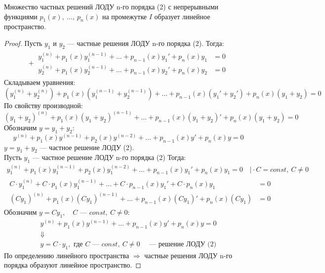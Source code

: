 \begin{theorem}
    Множество частных решений ЛОДУ n-го порядка (2) с непрерывными функциями $p_1(x),\ \ldots,\ p_n(x)$ на промежутке $I$ образует линейное пространство.
\end{theorem}
\begin{proof}
    Пусть $y_1$ и $y_2$ --- частные решения ЛОДУ n-го порядка (2). Тогда:
    \begin{align*}
        +\ \begin{aligned}
            y_1^{(n)} + p_1(x)y_1^{(n-1)} + \ldots + p_{n-1}(x)y_1' + p_n(x)y_1 &= 0 \\ 
            y_2^{(n)} + p_1(x)y_2^{(n-1)} + \ldots + p_{n-1}(x)y_2' + p_n(x)y_2 &= 0
        \end{aligned}
    \end{align*}
    Складываем уравнения:
    \[
        \left(y_1^{(n)} + y_2^{(n)}\right) + p_1(x)\left(y_1^{(n-1)} + y_2^{(n-1)}\right) + \ldots + p_{n-1} (x) \left(y_1' + y_2'\right) + p_n(x)\left(y_1 + y_2\right)= 0
    \]
    По свойству производной:
    \[
        (y_1 + y_2)^{(n)} + p_1(x) (y_1 + y_2)^{(n-1)} + \ldots + p_{n-1}(x)(y_1 + y_2)' + p_n(x)(y_1 + y_2) = 0
    \]
    Обозначим $y = y_1 + y_2$:
    \[
        y^{(n)} + p_1(x)y^{(n-1)}  + p_2(x)y^{(n-2)} + \ldots + p_{n-1}(x)y' + p_n(x)y = 0
    \]
    $y = y_1 + y_2$ --- частное решение ЛОДУ (2). \\
    Пусть $y_1$ --- частное решение ЛОДУ n-го порядка (2)
    Тогда:
    \begin{gather*}
        y_1^{(n)} + p_1(x)y_1^{(n-1)}  + p_2(x)y_1^{(n-2)} + \ldots + p_{n-1}(x)y_1' + p_n(x)y_1 = 0\quad \Big| \cdot C = const,\ C \ne 0 \\
        \begin{aligned}
            C\cdot y_1^{(n)} + C\cdot p_1(x)y_1^{(n-1)} + \ldots + C\cdot p_{n-1}(x) y_1' + C\cdot p_n(x) y_1 &= 0 \\
            (C y_1)^{(n)} + p_1(x)(Cy_1)^{(n-1)} + \ldots + p_{n-1}(x)(C y_1)' + p_n(x)(C y_1) &= 0
        \end{aligned}
    \end{gather*}
    Обозначим $y = Cy_1,\quad C \text{ --- } const,\ C \ne 0$:
    \begin{gather*}
        y^{(n)} + p_1(x)y^{(n-1)} + \ldots + p_{n-1}(x)y' + p_n(x)y = 0 \\
        \Downarrow \\
        y = C\cdot y_1, \text{ где } C \text{ --- } const,\ C \ne 0\quad \text{ --- решение ЛОДУ (2)} 
    \end{gather*}
    По определению линейного пространства $\Rightarrow$ частные решения ЛОДУ n-го порядка образуют линейное пространство.
\end{proof}

